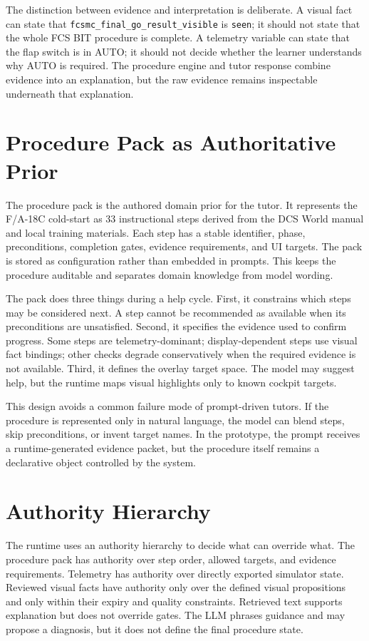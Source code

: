 The distinction between evidence and interpretation is deliberate. A visual
fact can state that \texttt{fcsmc\_final\_go\_result\_visible} is
\texttt{seen}; it should not state that the whole FCS BIT procedure is complete.
A telemetry variable can state that the flap switch is in AUTO; it should not
decide whether the learner understands why AUTO is required. The procedure
engine and tutor response combine evidence into an explanation, but the raw
evidence remains inspectable underneath that explanation.

\section{Procedure Pack as Authoritative Prior}\label{sec:design-procedure}

The procedure pack is the authored domain prior for the tutor. It represents
the F/A-18C cold-start as 33 instructional steps derived from the DCS World manual
and local training materials. Each step has a stable identifier, phase,
preconditions, completion gates, evidence requirements, and UI targets. The
pack is stored as configuration rather than embedded in prompts. This keeps the
procedure auditable and separates domain knowledge from model wording.

The pack does three things during a help cycle. First, it constrains which
steps may be considered next. A step cannot be recommended as available when
its preconditions are unsatisfied. Second, it specifies the evidence used to
confirm progress. Some steps are telemetry-dominant; display-dependent steps
use visual fact bindings; other checks degrade conservatively when the
required evidence is not available. Third, it defines the overlay target space.
The model may suggest help, but the runtime maps visual highlights only to
known cockpit targets.

This design avoids a common failure mode of prompt-driven tutors. If the
procedure is represented only in natural language, the model can blend steps,
skip preconditions, or invent target names. In the prototype, the prompt receives a
runtime-generated evidence packet, but the procedure itself remains a
declarative object controlled by the system.

\section{Authority Hierarchy}\label{sec:design-authority}

The runtime uses an authority hierarchy to decide what can override what. The
procedure pack has authority over step order, allowed targets, and evidence
requirements. Telemetry has authority over directly exported simulator state.
Reviewed visual facts have authority only over the defined visual propositions
and only within their expiry and quality constraints. Retrieved text supports
explanation but does not override gates. The LLM phrases guidance and may
propose a diagnosis, but it does not define the final procedure state.

